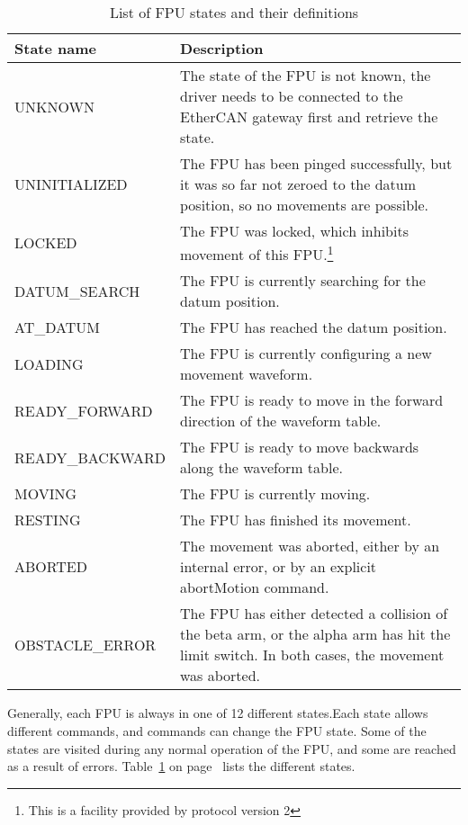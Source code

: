 \documentclass{scrartcl}[12pt,a4paper]
\begin{document}
\begin{table}
  \begin{centering}
\begin{tabular}{|l|p{}|}
  \hline
  \textbf{State name} & \textbf{Description} \\
  \hline 
UNKNOWN & The state of the FPU is not known, the driver needs to
be connected to the EtherCAN gateway first and retrieve the state.\\
\hline
UNINITIALIZED & The FPU has been pinged successfully, but it was
  so far not zeroed to the datum position, so no movements are
  possible.\\
\hline
LOCKED & The FPU was locked, which inhibits movement of this
  FPU.\footnote{This is a facility provided by protocol version 2}\\
\hline
DATUM\_SEARCH & The FPU is currently searching for the datum
position.\\
\hline
AT\_DATUM      & The FPU has reached the datum position.\\
\hline
LOADING & The FPU is currently configuring a new movement waveform.\\
\hline
READY\_FORWARD & The FPU is ready to move in the forward
  direction of the waveform table.\\
\hline
READY\_BACKWARD& The FPU is ready to move backwards along the
  waveform table.\\
\hline
MOVING        & The FPU is currently moving.\\
\hline
RESTING       & The FPU has finished its movement.\\
\hline
ABORTED & The movement was aborted, either by an internal error,
  or by an explicit abortMotion command.\\
\hline
OBSTACLE\_ERROR& The FPU has either detected a collision of the
  beta arm, or the alpha arm has hit the limit switch. In both cases, the
  movement was aborted. \\
\hline
\end{tabular}
\end{centering}
\caption{List of FPU states and their definitions}
\label{tab:fpustates}
\end{table}


Generally, each FPU is always in one of 12 different states.Each state
allows different commands, and commands can change the FPU state.
Some of the states are visited during any normal operation of the FPU,
and some are reached as a result of errors.  Table~\ref{tab:fpustates}
on page~\pageref{tab:fpustates} lists the different states.
\end{document}
